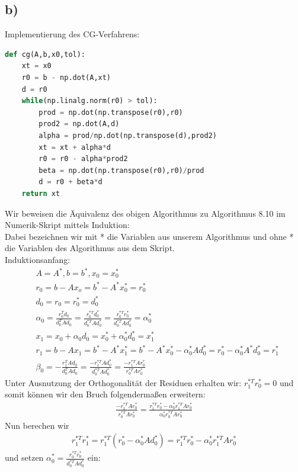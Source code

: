 \subsection*{b)}
Implementierung des CG-Verfahrens:
\begin{lstlisting}[language=Python]
def cg(A,b,x0,tol):
    xt = x0
    r0 = b - np.dot(A,xt)
    d = r0
    while(np.linalg.norm(r0) > tol):
        prod = np.dot(np.transpose(r0),r0)
        prod2 = np.dot(A,d)
        alpha = prod/np.dot(np.transpose(d),prod2)
        xt = xt + alpha*d
        r0 = r0 - alpha*prod2
        beta = np.dot(np.transpose(r0),r0)/prod
        d = r0 + beta*d
    return xt
\end{lstlisting} \label{cg}
Wir beweisen die Äquivalenz des obigen Algorithmus zu Algorithmus 8.10 im Numerik-Skript mittels Induktion: \\
Dabei bezeichnen wir mit * die Variablen aus unserem Algorithmus und ohne * die Variablen des Algorithmus
aus dem Skript. \\
Induktionsanfang: \\
\begin{align*}
   &A = A^*, b = b^*, x_0 = x_0^* \\
   &r_0 = b - Ax_o = b^* - A^*x_0^* = r_0^* \\
   &d_0 = r_0 = r_0^* = d_0^* \\
   &\alpha_0 = \frac{r_0^Td_0}{d_0^TAd_0} = \frac{r_0^{*T}d_0^*}{d_0^{*T}Ad_0^*} = \frac{r_0^{*T}r_0^*}{d_0^{*T}Ad_0^*} = \alpha_0^* \\
   &x_1 = x_0 + \alpha_0d_0 = x_0^* + \alpha_0^*d_0^* = x_1^* \\
   &r_1 = b - Ax_1 = b^* - A^*x_1^* = b^* - A^*x_0^* - \alpha_0^*Ad_0^* = r_0^* - \alpha_0^*A^*d_0^* = r_1^* \\
   &\beta_0 = - \frac{r_1^TAd_0}{d_0^TAd_0} = \frac{-r_1^{*T}Ad_0^*}{d_0^{*T}Ad_0^*} = \frac{-r_1^{*T}Ar_0^*}{r_0^{*T}Ar_0^*}
\end{align*}
Unter Ausnutzung der Orthogonalität der Residuen erhalten wir: $r_1^{*T}r_0^* = 0$ und somit können wir den Bruch
folgendermaßen erweitern:
\begin{align*}
  \frac{-r_1^{*T}Ar_0^*}{r_0^{*T}Ar_0^*} = \frac{r_1^{*T}r_0^* -\alpha_0^*r_1^{*T}Ar_0^*}{\alpha_0^*r_0^{*T}Ar_0^*}
\end{align*}
Nun berechen wir
\begin{align*}
  r_1^{*T}r_1^* = r_1^{*T}(r_0^*-\alpha_0^*Ad_0^*) = r_1^{*T}r_0^* - \alpha_0^*r_1^{*T}Ar_0^*
\end{align*}
und setzen $\alpha_0^* = \frac{r_0^{*T}r_0^*}{d_0^{*T}Ad_0^*}$ ein:

